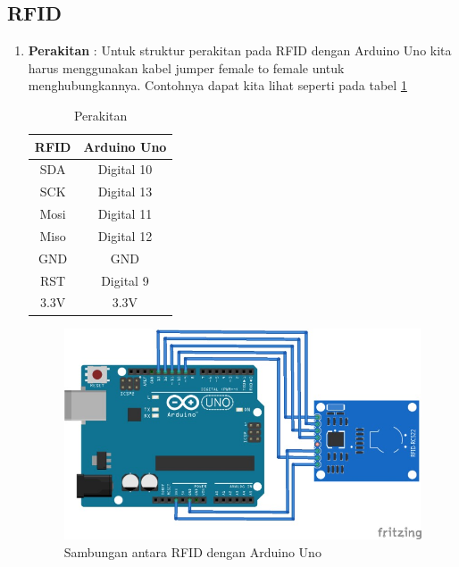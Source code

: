 \subsection{RFID}
\begin{enumerate}
\item \textbf{Perakitan} : Untuk struktur perakitan pada RFID dengan Arduino Uno kita harus menggunakan kabel jumper female to female untuk menghubungkannya. Contohnya dapat kita lihat seperti pada tabel \ref{table:Perakitan RFID}
\begin{table}[h]
\caption{Perakitan}
\centering
\begin{tabular}{|c|c|}
\hline
\textbf{RFID}&\textbf{Arduino Uno}\\
\hline
SDA&Digital 10\\
\hline
SCK&Digital 13\\
\hline
Mosi&Digital 11\\
\hline
Miso&Digital 12\\
\hline
GND&GND\\
\hline
RST&Digital 9\\
\hline
3.3V&3.3V\\
\hline
\end{tabular}
\label{table:Perakitan RFID}
\end{table}

\begin{figure}[!htbp]
\centering
\includegraphics[width=.75\textwidth]{figures/CONV/rfid.jpg}
\caption{Sambungan antara RFID dengan Arduino Uno}\label{fig:rfid}
\end{figure}
\end{enumerate}
  